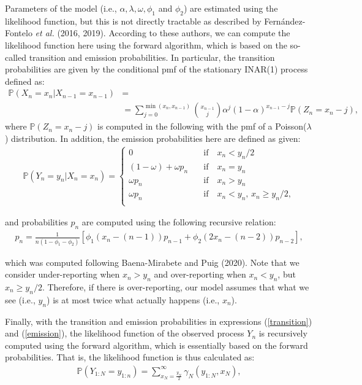 \documentclass[12pt,twoside, A4paper]{article}
\begin{document}
Parameters of the model (i.e., $\alpha, \lambda, \omega, \phi_1$ and $\phi_2$) are estimated using the likelihood function, but this is not directly tractable as described by Fern\'andez-Fontelo {\it et al.} (2016, 2019). According to these authors, we can compute the likelihood function here using the forward algorithm, which is based on the so-called transition and emission probabilities. In particular, the transition probabilities are given by the conditional pmf of the stationary INAR(1) process defined as: 
\begin{align}\label{transition}
\mathbb{P}(X_n=x_n|X_{n-1}=x_{n-1}) &= \nonumber \\ & =\sum_{j=0}^{\min(x_n,x_{n-1})} \binom{x_{n-1}}{j} \alpha^j (1-\alpha)^{x_{n-1}-j} \mathbb{P}(Z_n=x_n-j), 
\end{align}
where $\mathbb{P}(Z_n=x_n-j)$ is computed in the following with the pmf of a Poisson($\lambda$) distribution. In  addition, the emission probabilities here are defined as given:
\begin{align}\label{emission}
\mathbb{P}(Y_n=y_n|X_n=x_n)=\begin{cases}
0 & \quad \textrm{if} \quad x_n < y_n/2\\
(1-\omega)+\omega p_n & \quad \textrm{if} \quad x_n=y_n \\
\omega p_n & \quad \textrm{if}  \quad x_n > y_n\\
 \omega p_n & \quad \textrm{if}  \quad x_n < y_n, \, x_n \geq y_n/2,\\	
\end{cases}
\end{align}

and probabilities $p_n$ are computed using the following recursive relation:
\begin{align}\label{recursion}
p_n=\frac{1}{n(1-\phi_1-\phi_2)}\left[\phi_1 (x_n-(n-1))p_{n-1}+\phi_2(2x_n-(n-2))p_{n-2}\right],
\end{align}

which was computed following Baena-Mirabete and Puig (2020). Note that we consider under-reporting when $x_n>y_n$ and over-reporting when $x_n < y_n$, but $x_n \geq y_n/2$. Therefore, if there is over-reporting, our model assumes that what we see (i.e., $y_n$) is at most twice what actually happens (i.e., $x_n$).

Finally, with the transition and emission probabilities in expressions (\ref{transition}) and (\ref{emission}), the likelihood function of the observed process $Y_n$ is recursively computed using the forward algorithm, which is essentially based on the forward probabilities. That is, the likelihood function is thus calculated as:
\begin{align}
\mathbb{P}\left(Y_{1:N}=y_{1:n}\right)=\sum_{x_N=\frac{y_N}{2}}^{\infty}\gamma_N\left(y_{1:N},x_N\right),
\end{align}
\end{document}
